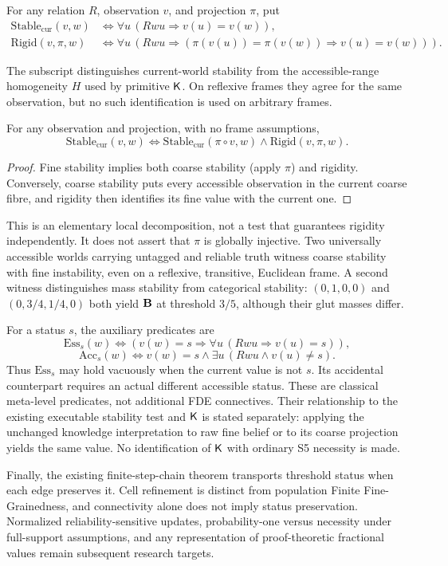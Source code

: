 \begin{definition}
For any relation \(R\), observation \(v\), and projection \(\pi\), put
\begin{align*}
 \mathrm{Stable}_{\mathrm{cur}}(v,w)
   &\iff \forall u\,(Rwu\Rightarrow v(u)=v(w)),\\
 \mathrm{Rigid}(v,\pi,w)
   &\iff \forall u\,(Rwu\Rightarrow
       (\pi(v(u))=\pi(v(w))\Rightarrow v(u)=v(w))).
\end{align*}
\end{definition}

The subscript distinguishes current-world stability from the accessible-range homogeneity \(H\) used by primitive \(\mathsf{K}\). On reflexive frames they agree for the same observation, but no such identification is used on arbitrary frames.

\begin{theorem}
For any observation and projection, with no frame assumptions,
\[
 \mathrm{Stable}_{\mathrm{cur}}(v,w)\iff
 \mathrm{Stable}_{\mathrm{cur}}(\pi\circ v,w)\land\mathrm{Rigid}(v,\pi,w).
\]
\statusverified
\end{theorem}
\begin{proof}
Fine stability implies both coarse stability (apply \(\pi\)) and rigidity. Conversely, coarse stability puts every accessible observation in the current coarse fibre, and rigidity then identifies its fine value with the current one.
\end{proof}
This is an elementary local decomposition, not a test that guarantees rigidity independently. It does not assert that \(\pi\) is globally injective.
Two universally accessible worlds carrying untagged and reliable truth witness
coarse stability with fine instability, even on a reflexive, transitive,
Euclidean frame. A second witness distinguishes mass stability from categorical
stability: \((0,1,0,0)\) and \((0,3/4,1/4,0)\) both yield \(\mathbf{B}\) at threshold
\(3/5\), although their glut masses differ.

For a status \(s\), the auxiliary predicates are
\[
 \mathrm{Ess}_s(w)\iff(v(w)=s\Rightarrow\forall u\,(Rwu\Rightarrow v(u)=s)),
\]
\[
 \mathrm{Acc}_s(w)\iff v(w)=s\land\exists u\,(Rwu\land v(u)\ne s).
\]
Thus \(\mathrm{Ess}_s\) may hold vacuously when the current value is not \(s\). Its accidental
counterpart requires an actual different accessible status. These are classical
meta-level predicates, not additional FDE connectives. Their relationship to
the existing executable stability test and \(\mathsf{K}\) is stated separately:
applying the unchanged knowledge interpretation to raw fine belief or to its
coarse projection yields the same value. No identification of \(\mathsf{K}\) with
ordinary S5 necessity is made.

Finally, the existing finite-step-chain theorem transports threshold status
when each edge preserves it. Cell refinement is distinct from population
Finite Fine-Grainedness, and connectivity alone does not imply status
preservation. Normalized reliability-sensitive updates, probability-one versus
necessity under full-support assumptions, and any representation of
proof-theoretic fractional values remain subsequent research targets.
